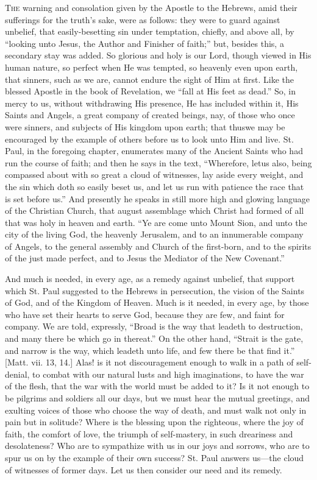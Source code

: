 T\textsc{he} warning and consolation given by the Apostle to the Hebrews,
amid their sufferings for the truth's sake, were as follows: they
were to guard against unbelief, that easily-besetting sin under
temptation, chiefly, and above all, by ``looking unto Jesus, the
Author and Finisher of faith;'' but, besides this, a secondary
stay was added. So glorious and holy is our Lord, though viewed in His
human nature, so perfect when He was tempted, so heavenly even upon
earth, that sinners, such as we are, cannot endure the sight of Him at
first. Like the blessed Apostle in the book of Revelation, we
``fall at His feet as dead.'' So, in mercy to us, without
withdrawing His presence, He has included within it, His Saints and
Angels, a great company of created beings, nay, of those who once were
sinners, and subjects of His kingdom upon earth; that thus\emph{}we
may be encouraged by the example of others before us to look unto Him
and live. St. Paul, in the foregoing chapter, enumerates many of the
Ancient Saints who had run the course of faith; and then he says in
the text, ``Wherefore, let\emph{}us also, being compassed about
with so great a cloud of witnesses, lay aside every weight, and the
sin which doth so easily beset us, and let us run with patience the
race that is set before us.'' And presently he speaks in still
more high and glowing language of the Christian Church, that august
assemblage which Christ had formed of all that was holy in heaven and
earth. ``Ye are come unto Mount Sion, and unto the city of the
living God, the heavenly Jerusalem, and to an innumerable company of
Angels, to the general assembly and Church of the first-born, and to
the spirits of the just made perfect, and to Jesus the Mediator of the
New Covenant.''

And much is needed, in every age, as a remedy against unbelief,
that support which St. Paul suggested to the Hebrews in persecution,
the vision of the Saints of God, and of the Kingdom of Heaven. Much is
it needed, in every age, by those who have set their hearts to serve
God, because they are few, and faint for company. We are told,
expressly, ``Broad is the way that leadeth to destruction, and
many there be which go in thereat.'' On the other hand,
``Strait is the gate, and narrow is the way, which leadeth unto
life, and few there be that find it.'' [Matt. vii. 13, 14.] Alas!
is it not discouragement enough to walk in a path of self-denial, to
combat with our natural lusts and high imaginations, to have the war
of the flesh, that the war with the world must be added to it? Is it
not enough to be pilgrims and soldiers all our days, but we must hear
the mutual greetings, and exulting voices of those who choose the way
of death, and must walk not only in pain but in solitude? Where is the
blessing upon the righteous, where the joy of faith, the comfort of
love, the triumph of self-mastery, in such dreariness and
desolateness? Who are to sympathize with us in our joys and sorrows,
who are to spur us on by the example of their own success? St. Paul
answers us—the cloud of witnesses of former days. Let us then
consider our need and its remedy.


